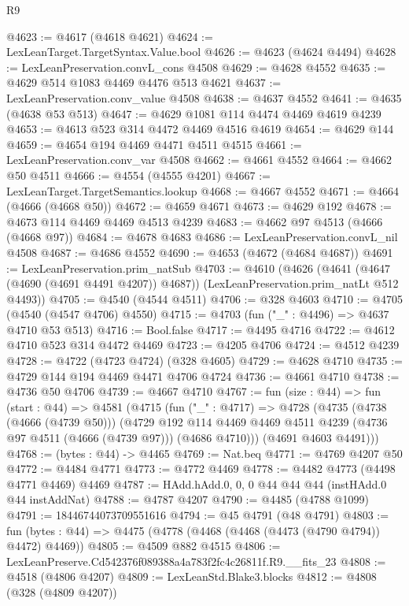\begin{lexlean}{R9}
\begin{coremodule}
@4623 := @4617 (@4618 @4621)
@4624 := LexLeanTarget.TargetSyntax.Value.bool
@4626 := @4623 (@4624 @4494)
@4628 := LexLeanPreservation.convL_cons @4508
@4629 := @4628 @4552
@4635 := @4629 @514 @1083 @4469 @4476 @513 @4621
@4637 := LexLeanPreservation.conv_value @4508
@4638 := @4637 @4552
@4641 := @4635 (@4638 @53 @513)
@4647 := @4629 @1081 @114 @4474 @4469 @4619 @4239
@4653 := @4613 @523 @314 @4472 @4469 @4516 @4619
@4654 := @4629 @144
@4659 := @4654 @194 @4469 @4471 @4511 @4515
@4661 := LexLeanPreservation.conv_var @4508
@4662 := @4661 @4552
@4664 := @4662 @50 @4511
@4666 := @4554 (@4555 @4201)
@4667 := LexLeanTarget.TargetSemantics.lookup
@4668 := @4667 @4552
@4671 := @4664 (@4666 (@4668 @50))
@4672 := @4659 @4671
@4673 := @4629 @192
@4678 := @4673 @114 @4469 @4469 @4513 @4239
@4683 := @4662 @97 @4513 (@4666 (@4668 @97))
@4684 := @4678 @4683
@4686 := LexLeanPreservation.convL_nil @4508
@4687 := @4686 @4552
@4690 := @4653 (@4672 (@4684 @4687))
@4691 := LexLeanPreservation.prim_natSub
@4703 := @4610
    (@4626
      (@4641 (@4647 (@4690 (@4691 @4491 @4207)) @4687))
      (LexLeanPreservation.prim_natLt @512 @4493))
@4705 := @4540 (@4544 @4511)
@4706 := @328 @4603
@4710 := @4705 (@4540 (@4547 @4706) @4550)
@4715 := @4703 (fun ("_" : @4496) => @4637 @4710 @53 @513)
@4716 := Bool.false
@4717 := @4495 @4716
@4722 := @4612 @4710 @523 @314 @4472 @4469
@4723 := @4205 @4706
@4724 := @4512 @4239
@4728 := @4722 (@4723 @4724) (@328 @4605)
@4729 := @4628 @4710
@4735 := @4729 @144 @194 @4469 @4471 @4706 @4724
@4736 := @4661 @4710
@4738 := @4736 @50 @4706
@4739 := @4667 @4710
@4767 := fun (size : @44) =>
  fun (start : @44) =>
  @4581
    (@4715
      (fun ("_" : @4717) =>
      @4728
        (@4735
          (@4738 (@4666 (@4739 @50)))
          (@4729
            @192
            @114
            @4469
            @4469
            @4511
            @4239
            (@4736 @97 @4511 (@4666 (@4739 @97)))
            (@4686 @4710)))
        (@4691 @4603 @4491)))
@4768 := (bytes : @44) -> @4465
@4769 := Nat.beq
@4771 := @4769 @4207 @50
@4772 := @4484 @4771
@4773 := @4772 @4469
@4778 := @4482 @4773 (@4498 @4771 @4469) @4469
@4787 := HAdd.hAdd.{0, 0, 0} @44 @44 @44 (instHAdd.{0} @44 instAddNat)
@4788 := @4787 @4207
@4790 := @4485 (@4788 @1099)
@4791 := 18446744073709551616
@4794 := @45 @4791 (@48 @4791)
@4803 := fun (bytes : @44) => @4475 (@4778 (@4468 (@4468 (@4473 (@4790 @4794)) @4472) @4469))
@4805 := @4509 @882 @4515
@4806 := LexLeanPreserve.Cd542376f089388a4a783f2fc4c26811f.R9.__fits_23
@4808 := @4518 (@4806 @4207)
@4809 := LexLeanStd.Blake3.blocks
@4812 := @4808 (@328 (@4809 @4207))

\end{coremodule}
\end{lexlean}
